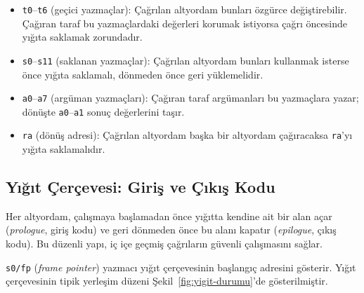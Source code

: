 \begin{itemize}[nosep]
\item \texttt{t0}--\texttt{t6} (geçici yazmaçlar): Çağrılan altyordam bunları özgürce değiştirebilir. Çağıran taraf bu yazmaçlardaki değerleri korumak istiyorsa çağrı öncesinde yığıta saklamak zorundadır.
\item \texttt{s0}--\texttt{s11} (saklanan yazmaçlar): Çağrılan altyordam bunları kullanmak isterse önce yığıta saklamalı, dönmeden önce geri yüklemelidir.
\item \texttt{a0}--\texttt{a7} (argüman yazmaçları): Çağıran taraf argümanları bu yazmaçlara yazar; dönüşte \texttt{a0}--\texttt{a1} sonuç değerlerini taşır.
\item \texttt{ra} (dönüş adresi): Çağrılan altyordam başka bir altyordam çağıracaksa \texttt{ra}'yı yığıta saklamalıdır.
\end{itemize}

\subsection{Yığıt Çerçevesi: Giriş ve Çıkış Kodu}
\label{sec:yigit-cercevesi}

Her altyordam, çalışmaya başlamadan önce yığıtta kendine ait bir alan açar (\emph{prologue}, giriş kodu) ve geri dönmeden önce bu alanı kapatır (\emph{epilogue}, çıkış kodu). Bu düzenli yapı, iç içe geçmiş çağrıların güvenli çalışmasını sağlar.

\texttt{s0/fp} (\emph{frame pointer}) yazmacı yığıt çerçevesinin başlangıç adresini gösterir. Yığıt çerçevesinin tipik yerleşim düzeni Şekil~\ref{fig:yigit-durumu}'de gösterilmiştir.


